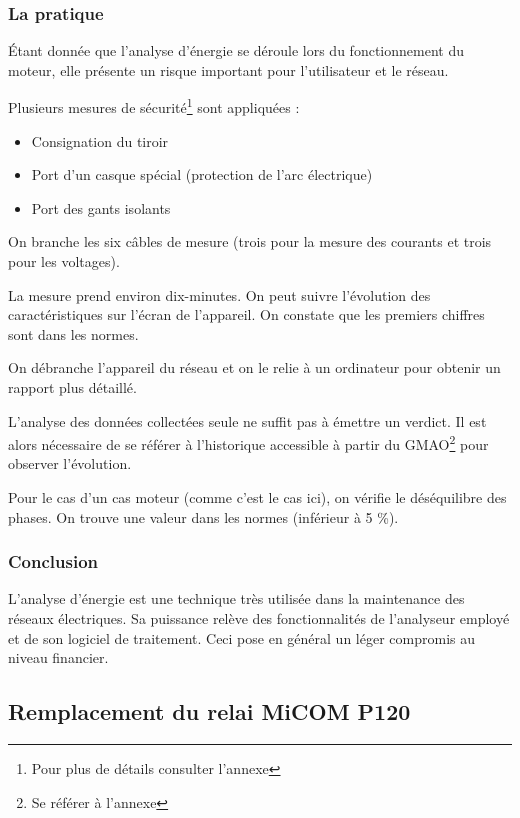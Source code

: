 \subsubsection{La pratique}

Étant donnée que l'analyse d'énergie se déroule lors du fonctionnement du moteur, elle  présente un risque important pour l'utilisateur et le réseau.

Plusieurs mesures de sécurité\footnote{Pour plus de détails consulter l'annexe \uppercase\expandafter{}} sont appliquées :

\begin{itemize}
\item Consignation du tiroir 
\item Port d'un casque spécial (protection de l'arc électrique)
\item Port des gants isolants

\end{itemize}

On branche les six câbles de mesure (trois pour la mesure des courants et trois pour les voltages). 

La mesure prend environ dix-minutes. On peut suivre l'évolution des caractéristiques sur l'écran de l'appareil. On constate que les premiers chiffres sont dans les normes.

On débranche l'appareil du réseau et on le relie à un ordinateur pour obtenir un rapport plus détaillé.

L'analyse  des données collectées seule ne suffit pas à émettre un verdict. Il est alors nécessaire  de se référer à l'historique accessible à partir du GMAO\footnote{Se référer à l'annexe \uppercase\expandafter{} } pour observer l'évolution. 

Pour le cas d'un cas moteur (comme c'est le cas ici), on vérifie le déséquilibre des phases. On trouve une valeur dans les normes (inférieur à 5 \%).
 
\subsubsection{Conclusion}
L'analyse d'énergie est une technique très utilisée dans la maintenance des réseaux électriques. Sa puissance relève des fonctionnalités de  l'analyseur employé et de son logiciel de traitement. Ceci  pose en général un léger compromis au niveau financier. %

\subsection{Remplacement du relai MiCOM P120}
